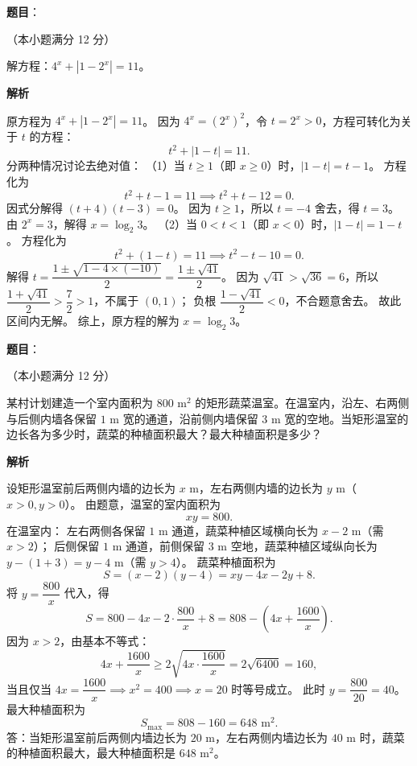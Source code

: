 \begin{answer}

\textbf{题目}：

（本小题满分 12 分）

解方程：$4^x+|1-2^x|=11$。

\textbf{解析}

原方程为 $4^x+|1-2^x|=11$。
因为 $4^x=(2^x)^2$，令 $t=2^x>0$，方程可转化为关于 $t$ 的方程：
\nopagebreak[4]
\[
t^2+|1-t|=11.
\]
分两种情况讨论去绝对值：
（1）当 $t\geqslant 1$（即 $x\geqslant 0$）时，$|1-t|=t-1$。
方程化为
\nopagebreak[4]
\[
t^2+t-1=11 \implies t^2+t-12=0.
\]
因式分解得 $(t+4)(t-3)=0$。
因为 $t\geqslant 1$，所以 $t=-4$ 舍去，得 $t=3$。
由 $2^x=3$，解得 $x=\log_2 3$。
（2）当 $0<t<1$（即 $x<0$）时，$|1-t|=1-t$。
方程化为
\nopagebreak[4]
\[
t^2+(1-t)=11 \implies t^2-t-10=0.
\]
解得 $t=\dfrac{1\pm\sqrt{1-4\times(-10)}}{2}=\dfrac{1\pm\sqrt{41}}{2}$。
因为 $\sqrt{41}>\sqrt{36}=6$，所以 $\dfrac{1+\sqrt{41}}{2}>\dfrac{7}{2}>1$，不属于 $(0,1)$；
负根 $\dfrac{1-\sqrt{41}}{2}<0$，不合题意舍去。
故此区间内无解。
综上，原方程的解为 $x=\log_2 3$。


\end{answer}
\begin{answer}

\textbf{题目}：

（本小题满分 12 分）

某村计划建造一个室内面积为 $800\text{ m}^2$ 的矩形蔬菜温室。在温室内，沿左、右两侧与后侧内墙各保留 $1\text{ m}$ 宽的通道，沿前侧内墙保留 $3\text{ m}$ 宽的空地。当矩形温室的边长各为多少时，蔬菜的种植面积最大？最大种植面积是多少？

\textbf{解析}

设矩形温室前后两侧内墙的边长为 $x\text{ m}$，左右两侧内墙的边长为 $y\text{ m}$（$x>0,y>0$）。
由题意，温室的室内面积为
\nopagebreak[4]
\[
xy=800.
\]
在温室内：
左右两侧各保留 $1\text{ m}$ 通道，蔬菜种植区域横向长为 $x-2\text{ m}$（需 $x>2$）；
后侧保留 $1\text{ m}$ 通道，前侧保留 $3\text{ m}$ 空地，蔬菜种植区域纵向长为 $y-(1+3)=y-4\text{ m}$（需 $y>4$）。
蔬菜种植面积为
\nopagebreak[4]
\[
S=(x-2)(y-4)=xy-4x-2y+8.
\]
将 $y=\dfrac{800}{x}$ 代入，得
\nopagebreak[4]
\[
S=800-4x-2\cdot\frac{800}{x}+8=808-\left(4x+\frac{1600}{x}\right).
\]
因为 $x>2$，由基本不等式：
\nopagebreak[4]
\[
4x+\frac{1600}{x}\geqslant 2\sqrt{4x\cdot\frac{1600}{x}}=2\sqrt{6400}=160,
\]
当且仅当 $4x=\dfrac{1600}{x} \implies x^2=400 \implies x=20$ 时等号成立。
此时 $y=\dfrac{800}{20}=40$。
最大种植面积为
\nopagebreak[4]
\[
S_{\max}=808-160=648\text{ m}^2.
\]
答：当矩形温室前后两侧内墙边长为 $20\text{ m}$，左右两侧内墙边长为 $40\text{ m}$ 时，蔬菜的种植面积最大，最大种植面积是 $648\text{ m}^2$。


\end{answer}
